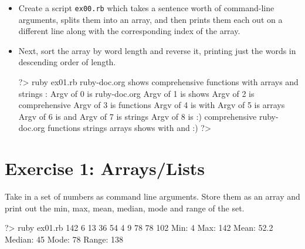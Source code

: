 \documentclass{42-en}
\begin{document}
\begin{itemize}

\item Create a script \texttt{ex00.rb} which takes a sentence worth of command-line arguments, splits them into an array, and then prints them each out on a different line along with the corresponding index of the array.
\item Next, sort the array by word length and reverse it, printing just the words in descending order of length.

\begin{42console}
	?> ruby ex01.rb ruby-doc.org shows comprehensive functions with arrays and strings :\)
	Argv of 0 is ruby-doc.org
	Argv of 1 is shows
	Argv of 2 is comprehensive
	Argv of 3 is functions
	Argv of 4 is with
	Argv of 5 is arrays
	Argv of 6 is and
	Argv of 7 is strings
	Argv of 8 is :)
	comprehensive
	ruby-doc.org
	functions
	strings
	arrays
	shows
	with
	and
	:)
	?>
\end{42console}

\end{itemize}



\chapter{Exercise 1: Arrays/Lists}

\makeheaderfiles

Take in a set of numbers as command line arguments. Store them as an array and print out the min, max, mean, median, mode and range of the set.

\begin{42console}
	?> ruby ex01.rb 142 6 13 36 54 4 9 78 78 102
	Min: 4
	Max: 142
	Mean: 52.2
	Median: 45
	Mode: 78
	Range: 138
\end{42console}
\end{document}
